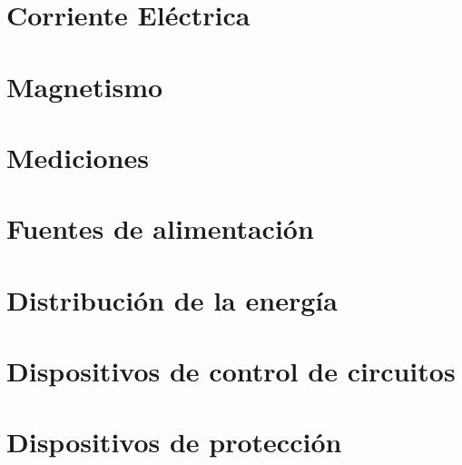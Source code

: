 \documentclass{article}
\begin{document}
\section{Corriente Eléctrica}
\section{Magnetismo}
\section{Mediciones}
\section{Fuentes de alimentación}
\section{Distribución de la energía}
\section{Dispositivos de control de circuitos}
\section{Dispositivos de protección}
\end{document}

